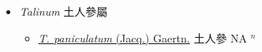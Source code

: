 
  \begin{itemize}
 \item[] \textit{Talinum} 土人參屬
                    
  \begin{itemize}
        \item[] \href{http://www.theplantlist.org/tpl1.1/search?q=Talinum+paniculatum}{\textit{T. paniculatum} (Jacq.) Gaertn.}   土人參 NA $^n$
  \end{itemize}
  \end{itemize}
